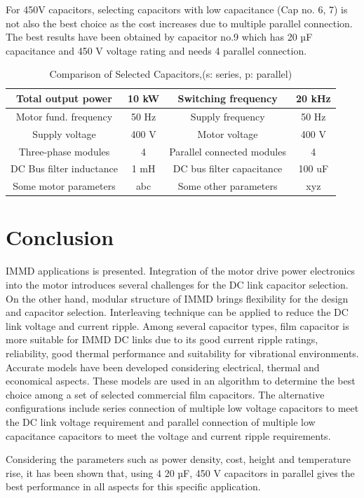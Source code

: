 \documentclass[conference,a4paper,twocolumn]{IEEEtran}
\begin{document}
For 450V capacitors, selecting capacitors with low capacitance (Cap no. 6, 7) is not also the best choice as the cost increases due to multiple parallel connection. The best results have been obtained by capacitor no.9 which has 20 µF capacitance and 450 V voltage rating and needs 4 parallel connection.


\begin{table}[h]
\renewcommand{\arraystretch}{1.4}
\caption{Comparison of Selected Capacitors,(s: series, p: parallel)}
\label{table3}
\centering
\begin{tabular}{|c|c|c|c|}
\hline
Total output power & 10 kW & Switching frequency & 20 kHz\\
\hline
Motor fund. frequency & 50 Hz & Supply frequency & 50 Hz\\
\hline
Supply voltage & 400 V & Motor voltage & 400 V\\
\hline
Three-phase modules & 4 & Parallel connected modules & 4\\
\hline
DC Bus filter inductance & 1 mH & DC bus filter capacitance & 100 uF\\
\hline
Some motor parameters & abc & Some other parameters & xyz\\
\hline
\end{tabular}
\end{table}


\section{Conclusion}

IMMD applications is presented. Integration of the motor drive power electronics into the motor introduces several challenges for the DC link capacitor selection. On the other hand, modular structure of IMMD brings flexibility for the design and capacitor selection. Interleaving technique can be applied to reduce the DC link voltage and current ripple. Among several capacitor types, film capacitor is more suitable for IMMD DC links due to its good current ripple ratings, reliability, good thermal performance and suitability for vibrational environments. Accurate models have been developed considering electrical, thermal and economical aspects. These models are used in an algorithm to determine the best choice among a set of selected commercial film capacitors. The alternative configurations include series connection of multiple low voltage capacitors to meet the DC link voltage requirement and parallel connection of multiple low capacitance capacitors to meet the voltage and current ripple requirements.

Considering the parameters such as power density, cost, height and temperature rise, it has been shown that, using 4 20 µF, 450 V capacitors in parallel gives the best performance in all aspects for this specific application.




\end{document}
